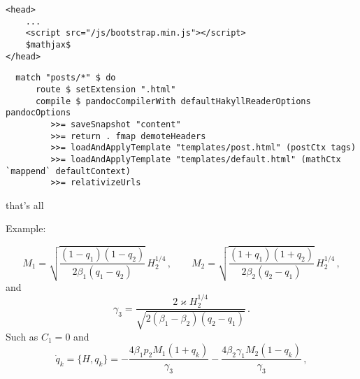\begin{verbatim}
<head>
    ...
    <script src="/js/bootstrap.min.js"></script>
    $mathjax$
</head>
\end{verbatim}

\begin{verbatim}
  match "posts/*" $ do
      route $ setExtension ".html"
      compile $ pandocCompilerWith defaultHakyllReaderOptions pandocOptions 
         >>= saveSnapshot "content"
         >>= return . fmap demoteHeaders
         >>= loadAndApplyTemplate "templates/post.html" (postCtx tags)
         >>= loadAndApplyTemplate "templates/default.html" (mathCtx `mappend` defaultContext)
         >>= relativizeUrls
\end{verbatim}

that's all

Example:

\newcommand\g{{\gamma}}

\[
    M_1=\sqrt{\dfrac{(1-q_1)(1-q_2)}{2\beta_1(q_1-q_2)}}\,H_2^{1/4}\,,\qquad
M_2=\sqrt{\dfrac{(1+q_1)(1+q_2)}{2\beta_2(q_2-q_1)}}\,H_2^{1/4}\,,\]
and
\[
    \g_3=\dfrac{2\varkappa H_2^{1/4}}{\sqrt{2(\beta_1-\beta_2)(q_2-q_1)}}\,.
\]
Such as  $C_1=0$ and
\[
    \dot{q}_k=\{H,q_k\}=-\dfrac{4\beta_1p_2M_1(1+q_k)}{\g_3}-\dfrac{4\beta_2\g_1M_2(1-q_k)}{\g_3}\,,
\]


